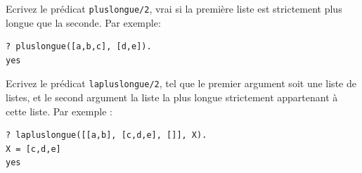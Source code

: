 \documentclass[a4paper]{article}
\newenvironment{CAnswer}{\color{red}\begin{Answer}}
                        {\end{Answer}}
\begin{document}
\begin{Exercise}[title={Plus longue}]
\Question Ecrivez le prédicat \verb$pluslongue/2$, vrai si la première liste
est strictement plus longue que la seconde. Par exemple:
\begin{verbatim}
?­ pluslongue([a,b,c], [d,e]).
yes
\end{verbatim}
\Question Ecrivez le prédicat \verb$lapluslongue/2$, tel que le premier
argument soit une liste de listes, et le second argument la liste la plus
longue strictement appartenant à cette liste. Par exemple :
\begin{verbatim}
?­ lapluslongue([[a,b], [c,d,e], []], X).
X = [c,d,e]
yes
\end{verbatim}
\end{Exercise}
\begin{CAnswer}

\end{CAnswer}
\end{document}
